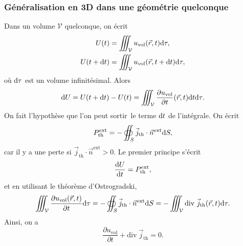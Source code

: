         \subsubsection{Généralisation en 3D dans une géométrie quelconque}
            
            Dans un volume $\mathcal{V}$ quelconque, on écrit
            \begin{equation}
                \begin{aligned}
                    U(t)&=\iiint_{\mathcal{V}}u_{\text{vol}}(\vec{r},t)\mathrm{d}\tau,\\
                    U(t+\mathrm{d} t)&=\iiint_{\mathcal{V}}u_{\text{vol}}(\vec{r},t+\mathrm{d} t)\mathrm{d}\tau,\\
                \end{aligned}
            \end{equation}
            où $\mathrm{d}\tau$ est un volume infinitésimal. Alors
            \begin{equation}
                \mathrm{d} U=U(t+\mathrm{d} t)-U(t)=\iiint_{\mathcal{V}}\frac{\partial u_{\text{vol}}}{\partial t}(\vec{r},t)\mathrm{d} t\mathrm{d}\tau.
            \end{equation}
            On fait l'hypothèse que l'on peut \og sortir\fg~le terme $\mathrm{d} t$ de l'intégrale. On écrit
            \begin{equation}
                P_{\text{th}}^{\text{ext}}=-\oiint_{S}\vec{j}_{\text{th}}\cdot\vec{n}^{\text{ext}}\mathrm{d} S,
            \end{equation}
            car il y a une perte si $\vec{j}_{\text{th}}\cdot\vec{n}^{\text{ext}}>0$. Le premier principe s'écrit 
            \begin{equation}
                \frac{\mathrm{d} U}{\mathrm{d} t}=P_{\text{th}}^{\text{ext}},
            \end{equation}
            et en utilisant le théorème d'Ostrogradski,
            \begin{equation}
                \iiint_{\mathcal{V}}\frac{\partial u_{\text{vol}}(\vec{r},t)}{\partial t}\mathrm{d}\tau=-\oiint_{S}\vec{j}_{\text{th}}\cdot\vec{n}^{\text{ext}}\mathrm{d} S=-\iiint_{\mathcal{V}}\mathrm{div}~\vec{j}_{\text{th}}(\vec{r},t)\mathrm{d}\tau.
            \end{equation}
            Ainsi, on a 
            \begin{equation}
                \boxed{
                    \frac{\partial u_{\text{vol}}}{\partial t}+\mathrm{div}~\vec{j}_{\text{th}}=0.
                }
            \end{equation}

